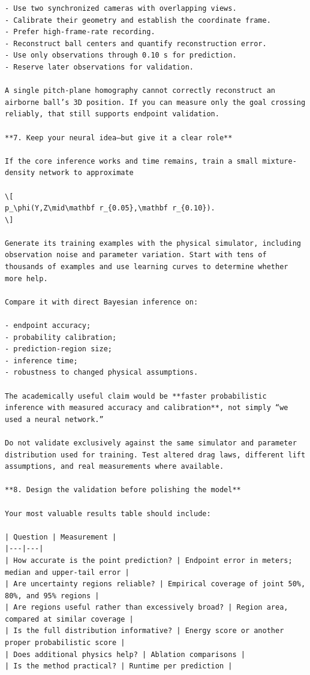 \documentclass[UTF8,10pt]{ctexart}
\begin{document}
\begin{Verbatim}[breaklines=true,breakanywhere=true,fontsize=\scriptsize,frame=single,framesep=2pt]
- Use two synchronized cameras with overlapping views.
- Calibrate their geometry and establish the coordinate frame.
- Prefer high-frame-rate recording.
- Reconstruct ball centers and quantify reconstruction error.
- Use only observations through 0.10 s for prediction.
- Reserve later observations for validation.

A single pitch-plane homography cannot correctly reconstruct an airborne ball’s 3D position. If you can measure only the goal crossing reliably, that still supports endpoint validation.

**7. Keep your neural idea—but give it a clear role**

If the core inference works and time remains, train a small mixture-density network to approximate

\[
p_\phi(Y,Z\mid\mathbf r_{0.05},\mathbf r_{0.10}).
\]

Generate its training examples with the physical simulator, including observation noise and parameter variation. Start with tens of thousands of examples and use learning curves to determine whether more help.

Compare it with direct Bayesian inference on:

- endpoint accuracy;
- probability calibration;
- prediction-region size;
- inference time;
- robustness to changed physical assumptions.

The academically useful claim would be **faster probabilistic inference with measured accuracy and calibration**, not simply “we used a neural network.”

Do not validate exclusively against the same simulator and parameter distribution used for training. Test altered drag laws, different lift assumptions, and real measurements where available.

**8. Design the validation before polishing the model**

Your most valuable results table should include:

| Question | Measurement |
|---|---|
| How accurate is the point prediction? | Endpoint error in meters; median and upper-tail error |
| Are uncertainty regions reliable? | Empirical coverage of joint 50%, 80%, and 95% regions |
| Are regions useful rather than excessively broad? | Region area, compared at similar coverage |
| Is the full distribution informative? | Energy score or another proper probabilistic score |
| Does additional physics help? | Ablation comparisons |
| Is the method practical? | Runtime per prediction |


\end{Verbatim}
\end{document}
